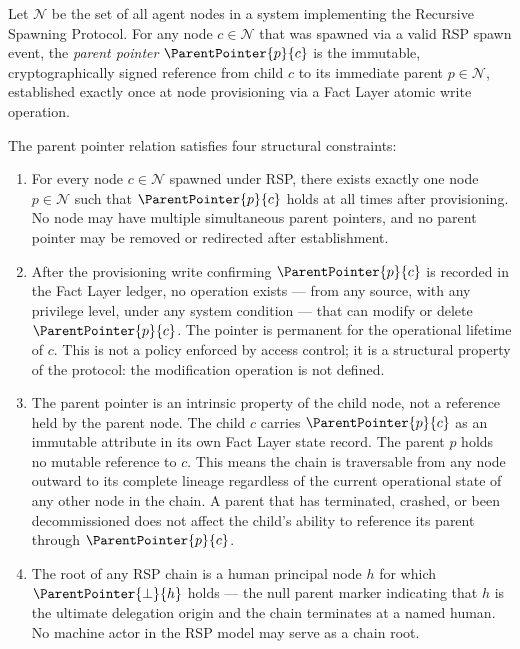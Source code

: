 \begin{definition}
\label{def:parent-pointer}
Let $\mathcal{N}$ be the set of all agent nodes in a \bxthree{} system implementing the Recursive Spawning Protocol. For any node $c \in \mathcal{N}$ that was spawned via a valid RSP spawn event, the \emph{parent pointer} $\ParentPointer{p}{c}$ is the immutable, cryptographically signed reference from child $c$ to its immediate parent $p \in \mathcal{N}$, established exactly once at node provisioning via a Fact Layer atomic write operation.

The parent pointer relation satisfies four structural constraints:

\begin{enumerate}
    \item[(P1) \textbf{Uniqueness}] For every node $c \in \mathcal{N}$ spawned under RSP, there exists exactly one node $p \in \mathcal{N}$ such that $\ParentPointer{p}{c}$ holds at all times after provisioning. No node may have multiple simultaneous parent pointers, and no parent pointer may be removed or redirected after establishment.

    \item[(P2) \textbf{Immutability}] After the provisioning write confirming $\ParentPointer{p}{c}$ is recorded in the Fact Layer ledger, no operation exists --- from any source, with any privilege level, under any system condition --- that can modify or delete $\ParentPointer{p}{c}$. The pointer is permanent for the operational lifetime of $c$. This is not a policy enforced by access control; it is a structural property of the protocol: the modification operation is not defined.

    \item[(P3) \textbf{Directionality}] The parent pointer is an intrinsic property of the child node, not a reference held by the parent node. The child $c$ carries $\ParentPointer{p}{c}$ as an immutable attribute in its own Fact Layer state record. The parent $p$ holds no mutable reference to $c$. This means the chain is traversable from any node outward to its complete lineage regardless of the current operational state of any other node in the chain. A parent that has terminated, crashed, or been decommissioned does not affect the child's ability to reference its parent through $\ParentPointer{p}{c}$.

    \item[(P4) \textbf{Termination at Human Anchor}] The root of any RSP chain is a human principal node $h$ for which $\ParentPointer{\bot}{h}$ holds --- the null parent marker indicating that $h$ is the ultimate delegation origin and the chain terminates at a named human. No machine actor in the RSP model may serve as a chain root.
\end{enumerate}
\end{definition}


